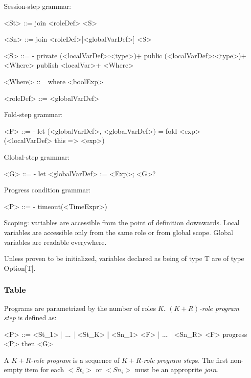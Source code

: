 \documentclass[acmsmall,review,anonymous]{acmart}\settopmatter{printfolios=true}
\begin{document}
Session-step grammar:

\begin{grammar}
	<St> ::= join <roleDef> %
		\alt <S>

	<Sn> ::= join <roleDef>[<globalVarDef>] %
		\alt <S>
	
	<S>  ::= -
		\alt private (<localVarDef>:<type>)+
        \alt public (<localVarDef>:<type>)+ <Where>
		\alt publish <localVar>+ <Where>
	
	<Where> ::= where <boolExp>
	
	<roleDef> ::= <globalVarDef>
\end{grammar}

Fold-step grammar:

\begin{grammar}
	<F> ::= -
		\alt let (<globalVarDef>, <globalVarDef>) = fold <exp> (<localVarDef> this => <exp>)  %
\end{grammar}

Global-step grammar:
\begin{grammar}
	<G> ::= -
		\alt let <globalVarDef> := <Exp>; <G>?
\end{grammar}

Progress condition grammar:
\begin{grammar}
	<P> ::= -
		\alt timeout(<TimeExpr>)
\end{grammar}

Scoping: variables are accessible from the point of definition downwards.
Local variables are accessible only from the same role or from global scope.
Global variables are readable everywhere.

Unless proven to be initialized, variables declared as being of type T are of type Option[T].

\subsubsection{Table}
Programs are parametrized by the number of roles $K$. \emph{$(K+R)$-role program step} is defined as:

\begin{grammar}
	<P> ::= <St_1> | ... | <St_K> | <Sn_1> <F> | ... | <Sn_R> <F> progress <P> then <G>
\end{grammar}

A \emph{$K+R$-role program} is a sequence of \emph{$K+R$-role program step}s.
The first non-empty item for each $<St_i>$ or $<Sn_i>$ must be an approprite $join$.
\end{document}
